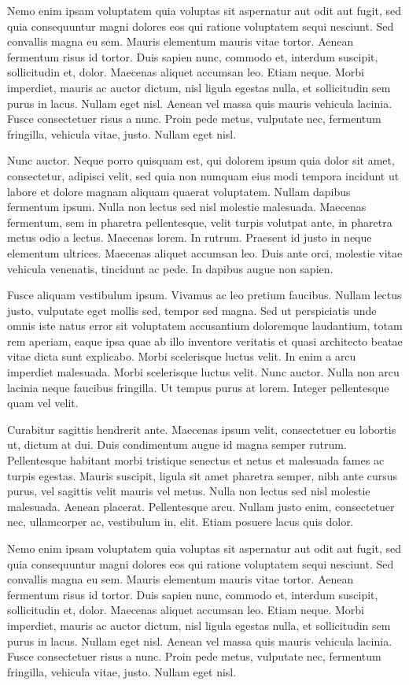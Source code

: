 Nemo enim ipsam voluptatem quia voluptas sit aspernatur aut odit aut fugit, sed quia consequuntur magni dolores eos qui ratione voluptatem sequi nesciunt. Sed convallis magna eu sem. Mauris elementum mauris vitae tortor. Aenean fermentum risus id tortor. Duis sapien nunc, commodo et, interdum suscipit, sollicitudin et, dolor. Maecenas aliquet accumsan leo. Etiam neque. Morbi imperdiet, mauris ac auctor dictum, nisl ligula egestas nulla, et sollicitudin sem purus in lacus. Nullam eget nisl. Aenean vel massa quis mauris vehicula lacinia. Fusce consectetuer risus a nunc. Proin pede metus, vulputate nec, fermentum fringilla, vehicula vitae, justo. Nullam eget nisl.

Nunc auctor. Neque porro quisquam est, qui dolorem ipsum quia dolor sit amet, consectetur, adipisci velit, sed quia non numquam eius modi tempora incidunt ut labore et dolore magnam aliquam quaerat voluptatem. Nullam dapibus fermentum ipsum. Nulla non lectus sed nisl molestie malesuada. Maecenas fermentum, sem in pharetra pellentesque, velit turpis volutpat ante, in pharetra metus odio a lectus. Maecenas lorem. In rutrum. Praesent id justo in neque elementum ultrices. Maecenas aliquet accumsan leo. Duis ante orci, molestie vitae vehicula venenatis, tincidunt ac pede. In dapibus augue non sapien.

Fusce aliquam vestibulum ipsum. Vivamus ac leo pretium faucibus. Nullam lectus justo, vulputate eget mollis sed, tempor sed magna. Sed ut perspiciatis unde omnis iste natus error sit voluptatem accusantium doloremque laudantium, totam rem aperiam, eaque ipsa quae ab illo inventore veritatis et quasi architecto beatae vitae dicta sunt explicabo. Morbi scelerisque luctus velit. In enim a arcu imperdiet malesuada. Morbi scelerisque luctus velit. Nunc auctor. Nulla non arcu lacinia neque faucibus fringilla. Ut tempus purus at lorem. Integer pellentesque quam vel velit.

Curabitur sagittis hendrerit ante. Maecenas ipsum velit, consectetuer eu lobortis ut, dictum at dui. Duis condimentum augue id magna semper rutrum. Pellentesque habitant morbi tristique senectus et netus et malesuada fames ac turpis egestas. Mauris suscipit, ligula sit amet pharetra semper, nibh ante cursus purus, vel sagittis velit mauris vel metus. Nulla non lectus sed nisl molestie malesuada. Aenean placerat. Pellentesque arcu. Nullam justo enim, consectetuer nec, ullamcorper ac, vestibulum in, elit. Etiam posuere lacus quis dolor.

Nemo enim ipsam voluptatem quia voluptas sit aspernatur aut odit aut fugit, sed quia consequuntur magni dolores eos qui ratione voluptatem sequi nesciunt. Sed convallis magna eu sem. Mauris elementum mauris vitae tortor. Aenean fermentum risus id tortor. Duis sapien nunc, commodo et, interdum suscipit, sollicitudin et, dolor. Maecenas aliquet accumsan leo. Etiam neque. Morbi imperdiet, mauris ac auctor dictum, nisl ligula egestas nulla, et sollicitudin sem purus in lacus. Nullam eget nisl. Aenean vel massa quis mauris vehicula lacinia. Fusce consectetuer risus a nunc. Proin pede metus, vulputate nec, fermentum fringilla, vehicula vitae, justo. Nullam eget nisl.

